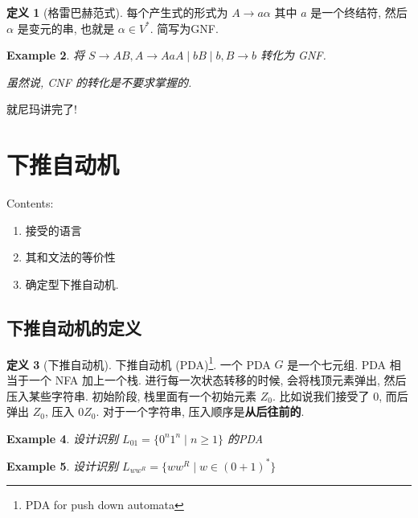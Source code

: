 \documentclass[12pt]{ctexart}
\theoremstyle{definition}
\newtheorem{definition}{定义}[section]
\theoremstyle{plain}
\newtheorem{exam}[definition]{Example}
\theoremstyle{remark}
\begin{document}
\begin{definition}[格雷巴赫范式]\label{def:格雷巴赫范式}
	每个产生式的形式为 \(A \to a\alpha\) 其中 \(a\) 是一个终结符, 然后 \(\alpha\) 是变元的串, 也就是 \(\alpha \in  V ^{*}\). 简写为GNF. 
\end{definition}
\begin{exam}
将 \(S \to A B  , A \to Aa A \mid bB \mid b , B \to b\) 转化为 GNF.

虽然说, CNF 的转化是不要求掌握的. 
\end{exam}
就尼玛讲完了! 

\section{下推自动机}
\label{sec:下推自动机}

\noindent Contents:
\begin{enumerate}
	\item 接受的语言
	\item 其和文法的等价性
	\item 确定型下推自动机. 
\end{enumerate}

\subsection{下推自动机的定义}
\begin{definition}[下推自动机]\label{def:下推自动机}
	下推自动机 (PDA)\footnote{PDA for push down automata}. 一个 PDA \(G\) 是一个七元组. 
	PDA 相当于一个 NFA 加上一个栈. 进行每一次状态转移的时候, 会将栈顶元素弹出, 然后压入某些字符串. 
	初始阶段, 栈里面有一个初始元素 \(Z_{0}\). 比如说我们接受了 \(0\), 而后弹出 \(Z_{0}\), 压入 \(0Z_{0}\). 对于一个字符串, 压入顺序是\textbf{从后往前的}. 
\end{definition}

\begin{exam}
	设计识别 \(L _{01} = \{ 0 ^{n} 1 ^{n} \mid n \ge 1 \} \) 的PDA
\end{exam}

\begin{exam}
	设计识别 \(L _{w w ^{R}}= \{ w w ^{R} \mid w \in ( 0 + 1) ^{*} \}\)
\end{exam}

\end{document}
